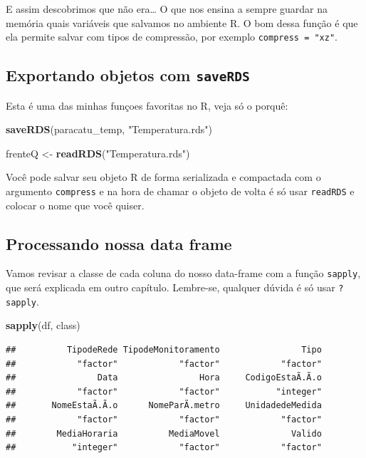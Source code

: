 \documentclass[]{book}
\newenvironment{Shaded}{\begin{snugshade}}{\end{snugshade}}
\newcommand{\KeywordTok}[1]{\textcolor[rgb]{0.13,0.29,0.53}{\textbf{#1}}}
\newcommand{\StringTok}[1]{\textcolor[rgb]{0.31,0.60,0.02}{#1}}
\newcommand{\NormalTok}[1]{#1}
\theoremstyle{definition}
\theoremstyle{definition}
\theoremstyle{definition}
\theoremstyle{remark}
\begin{document}
E assim descobrimos que não era\ldots{} O que nos ensina a sempre
guardar na memória quais variáveis que salvamos no ambiente R. O bom
dessa função é que ela permite salvar com tipos de compressão, por
exemplo \texttt{compress\ =\ "xz"}.

\subsection{\texorpdfstring{Exportando objetos com
\texttt{saveRDS}}{Exportando objetos com saveRDS}}\label{exportando-objetos-com-saverds}

Esta é uma das minhas funçoes favoritas no R, veja só o porquê:

\begin{Shaded}
\begin{Highlighting}[]
\KeywordTok{saveRDS}\NormalTok{(paracatu_temp, }\StringTok{"Temperatura.rds"}\NormalTok{)}
\end{Highlighting}
\end{Shaded}

\begin{Shaded}
\begin{Highlighting}[]
\NormalTok{frenteQ <-}\StringTok{ }\KeywordTok{readRDS}\NormalTok{(}\StringTok{"Temperatura.rds"}\NormalTok{)}
\end{Highlighting}
\end{Shaded}

Você pode salvar seu objeto R de forma serializada e compactada com o
argumento \texttt{compress} e na hora de chamar o objeto de volta é só
usar \texttt{readRDS} e colocar o nome que você quiser.

\hypertarget{processing_dfs}{\subsection{Processando nossa data
frame}\label{processing_dfs}}

Vamos revisar a classe de cada coluna do nosso data-frame com a função
\texttt{sapply}, que será explicada em outro capítulo. Lembre-se,
qualquer dúvida é só usar \texttt{?sapply}.

\begin{Shaded}
\begin{Highlighting}[]
\KeywordTok{sapply}\NormalTok{(df, class)}
\end{Highlighting}
\end{Shaded}

\begin{verbatim}
##          TipodeRede TipodeMonitoramento                Tipo 
##            "factor"            "factor"            "factor" 
##                Data                Hora     CodigoEstaÃ.Ã.o 
##            "factor"            "factor"           "integer" 
##       NomeEstaÃ.Ã.o      NomeParÃ.metro     UnidadedeMedida 
##            "factor"            "factor"            "factor" 
##        MediaHoraria          MediaMovel              Valido 
##           "integer"            "factor"            "factor"
\end{verbatim}
\end{document}
